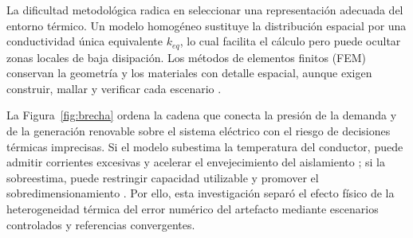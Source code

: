 La dificultad metodológica radica en seleccionar una representación adecuada del entorno térmico. Un modelo homogéneo sustituye la distribución espacial por una conductividad única equivalente $k_{eq}$, lo cual facilita el cálculo pero puede ocultar zonas locales de baja disipación. Los métodos de elementos finitos (FEM) conservan la geometría y los materiales con detalle espacial, aunque exigen construir, mallar y verificar cada escenario \parencites[3--4,93--99]{cigre2025}[1--3]{aldulaimi2024}.

La Figura~\ref{fig:brecha} ordena la cadena que conecta la presión de la demanda y de la generación renovable sobre el sistema eléctrico con el riesgo de decisiones térmicas imprecisas. Si el modelo subestima la temperatura del conductor, puede admitir corrientes excesivas y acelerar el envejecimiento del aislamiento \parencite[1--2,9]{khumalo2025}; si la sobreestima, puede restringir capacidad utilizable y promover el sobredimensionamiento \parencites[4--6]{enescu2021}[1--2,9]{khumalo2025}. Por ello, esta investigación separó el efecto físico de la heterogeneidad térmica del error numérico del artefacto mediante escenarios controlados y referencias convergentes.

